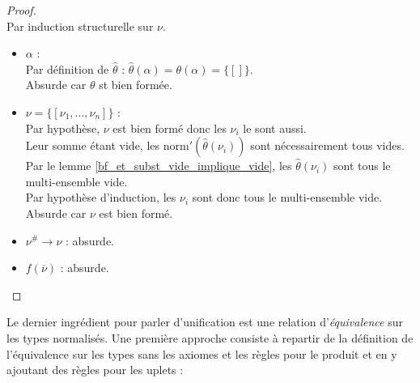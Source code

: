 \documentclass[a4paper]{report}
\newenvironment{preuve} 
  {\begin{proof}~\\} 
  {\end{proof}}
\theoremstyle{definition}
\newcommand{\mset}[1]{\{\![#1]\!\}}
\newcommand{\norm}{\mathrm{norm}}
\begin{document}
\begin{preuve}
  Par induction structurelle sur $\nu$.
  \begin{itemize}[label={\textbf{Cas}}]
    \item
      $\alpha$ : \\
      Par définition de $\hat\theta$ : $\hat\theta (\alpha) = \theta (\alpha) = \mset{}$. \\
      Absurde car $\theta$ st bien formée.
    \item
      $\nu = \mset{\nu_1, \dots, \nu_n}$ : \\
      Par hypothèse, $\nu$ est bien formé donc les $\nu_i$ le sont aussi. \\
      Leur somme étant vide, les $\norm' (\hat\theta (\nu_i))$ sont nécessairement tous vides. \\
      Par le lemme \ref{bf_et_subst_vide_implique_vide}, les $\hat\theta (\nu_i)$ sont tous le multi-ensemble vide. \\
      Par hypothèse d'induction, les $\nu_i$ sont donc tous le multi-ensemble vide. \\
      Absurde car $\nu$ est bien formé.
    \item
      $\nu^\# \rightarrow \nu$ : absurde.
    \item
      $f (\overline \nu)$ : absurde.
  \end{itemize}
\end{preuve}

Le dernier ingrédient pour parler d'unification est une relation d'\emph{équivalence} sur les types normalisés. Une première approche consiste à repartir de la définition de l'équivalence sur les types sans les axiomes et les règles pour le produit et en y ajoutant des règles pour les uplets :
\end{document}
